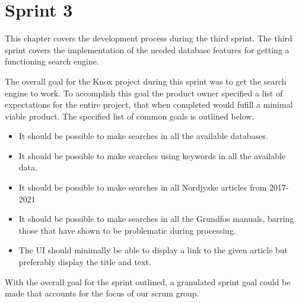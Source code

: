 \chapter{Sprint 3}
This chapter covers the development process during the third sprint. The third sprint covers the implementation of the needed database features for getting a functioning search engine. 


The overall goal for the Knox project during this sprint was to get the search engine to work. To accomplish this goal the product owner specified a list of expectations for the entire \knox project, that when completed would fufill a minimal viable product. The specified list of common goals is outlined below.
\begin{itemize}
	\item It should be possible to make searches in all the available databases.
	\item It should be possible to make searches using keywords in all the available data.
	\item It should be possible to make searches in all Nordjyske articles from 2017-2021
	\item It should be possible to make searches in all the Grundfos manuals, barring those that have shown to be problematic during processing.
	\item The UI should minimally be able to display a link to the given article but preferably display the title and text.
\end{itemize}

With the overall goal for the sprint outlined, a granulated sprint goal could be made that accounts for the focus of our scrum group.






